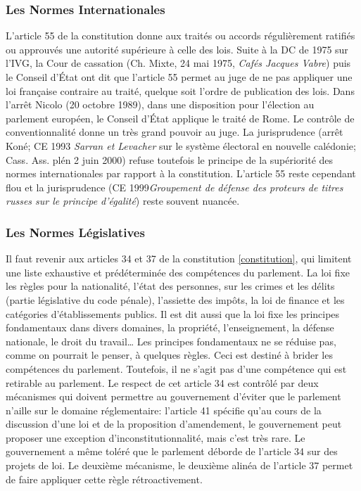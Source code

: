 \documentclass[math]{cours}
\begin{document}
\subsubsection{Les Normes Internationales}
L'article 55 de la constitution donne aux traités ou accords régulièrement ratifiés ou approuvés une autorité supérieure à celle des lois.
Suite à la DC de 1975 sur l'IVG, la Cour de cassation (Ch. Mixte, 24 mai 1975, \emph{Cafés Jacques Vabre}) puis le Conseil d'État ont dit que l'article 55 permet au juge de ne pas appliquer une loi française contraire au traité, quelque soit l'ordre de publication des lois.
Dans l'arrêt Nicolo (20 octobre 1989), dans une disposition pour l'élection au parlement européen, le Conseil d'État applique le traité de Rome.
Le contrôle de conventionnalité donne un très grand pouvoir au juge.
La jurisprudence (arrêt Koné; CE 1993 \emph{Sarran et Levacher} sur le système électoral en nouvelle calédonie; Cass. Ass. plén 2 juin 2000) refuse toutefois le principe de la supériorité des normes internationales par rapport à la constitution.
L'article 55 reste cependant flou et la jurisprudence (CE 1999\emph{Groupement de défense des proteurs de titres russes sur le principe d'égalité}) reste souvent nuancée.

\subsubsection{Les Normes Législatives}
Il faut revenir aux articles 34 et 37 de la constitution \ref{constitution}, qui limitent une liste exhaustive et prédéterminée des compétences du parlement.
La loi fixe les règles pour la nationalité, l'état des personnes, sur les crimes et les délits (partie législative du code pénale), l'assiette des impôts, la loi de finance et les catégories d'établissements publics.
Il est dit aussi que la loi fixe les principes fondamentaux dans divers domaines, la propriété, l'enseignement, la défense nationale, le droit du travail\ldots
Les principes fondamentaux ne se réduise pas, comme on pourrait le penser, à quelques règles.
Ceci est destiné à brider les compétences du parlement.
Toutefois, il ne s'agit pas d'une compétence qui est retirable au parlement.
Le respect de cet article 34 est contrôlé par deux mécanismes qui doivent permettre au gouvernement d'éviter que le parlement n'aille sur le domaine réglementaire: l'article 41 spécifie qu'au cours de la discussion d'une loi et de la proposition d'amendement, le gouvernement peut proposer une exception d'inconstitutionnalité, mais c'est très rare.
Le gouvernement a même toléré que le parlement déborde de l'article 34 sur des projets de loi.
Le deuxième mécanisme, le deuxième alinéa de l'article 37 permet de faire appliquer cette règle rétroactivement.
\end{document}
